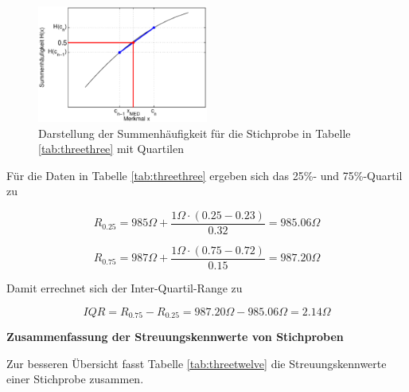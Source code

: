 \noindent 
\begin{figure}[H]
  \centerline{\includegraphics[width=0.5\textwidth]{Kapitel3/Bilder/image8}}
  \caption{Darstellung der Summenh\"{a}ufigkeit f\"{u}r die Stichprobe in Tabelle \ref{tab:threethree} mit Quartilen }
  \label{fig:SummenhQuantileStichprobeWiderstand}
\end{figure}

\noindent F\"{u}r die Daten in Tabelle \ref{tab:threethree} ergeben sich das 25\%- und 75\%-Quartil zu 

\begin{equation}\label{eq:threefourtysix}
R_{0.25} =985 \Omega +\dfrac{1 \Omega \cdot (0.25-0.23)}{0.32} = 985.06 \Omega
\end{equation} 

\begin{equation}\label{eq:threefourtyseven}
R_{0.75} =987 \Omega +\dfrac{1 \Omega \cdot (0.75-0.72)}{0.15} = 987.20 \Omega
\end{equation} 

\noindent Damit errechnet sich der Inter-Quartil-Range zu

\begin{equation}\label{eq:threefourtyeight}
IQR=R_{0.75} -R_{0.25} = 987.20 \Omega - 985.06 \Omega =2.14 \Omega 
\end{equation} 

\clearpage

{\selectfont
\noindent\textbf{Zusammenfassung der Streuungskennwerte von Stichproben}}

\noindent Zur besseren \"{U}bersicht fasst Tabelle \ref{tab:threetwelve} die Streuungskennwerte einer Stichprobe zusammen.

